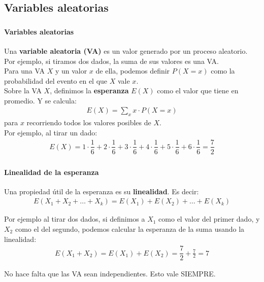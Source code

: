 \documentclass{beamer}
\begin{document}
\subsection{Variables aleatorias}

\begin{frame}
  \frametitle{\SECTIONA}
  \framesubtitle{Variables aleatorias}

  Una \textbf{variable aleatoria (VA)} es un valor generado por un proceso aleatorio. Por ejemplo, si tiramos dos dados, la suma de sus valores es una VA. \pause \\
  Para una VA \(X\) y un valor \(x\) de ella, podemos definir \(P(X = x)\) como la probabilidad del evento en el que \(X\) vale \(x\). \pause \\

  Sobre la VA \(X\), definimos la \textbf{esperanza} \(E(X)\) como el valor que tiene en promedio. Y se calcula:
  \begin{gather*}
    E(X) = \sum_{x}x \cdot P(X = x)
  \end{gather*}
  para \(x\) recorriendo todos los valores posibles de \(X\). \pause \\
  Por ejemplo, al tirar un dado:
  \begin{gather*}
    E(X) = 1 \cdot \dfrac{1}{6} + 2 \cdot \dfrac{1}{6} + 3 \cdot \dfrac{1}{6} + 4 \cdot \dfrac{1}{6} + 5 \cdot \dfrac{1}{6} + 6 \cdot \dfrac{1}{6} = \dfrac{7}{2}
  \end{gather*}
\end{frame}

\begin{frame}
  \frametitle{\SECTIONA}
  \framesubtitle{Linealidad de la esperanza}

  Una propiedad útil de la esperanza es su \textbf{linealidad}. Es decir:
  \begin{gather*}
    E(X_{1} + X_{2} + \ldots + X_{k}) = E(X_{1}) + E(X_{2}) + \ldots + E(X_{k})
  \end{gather*} \pause

  Por ejemplo al tirar dos dados, si definimos a \(X_{1}\) como el valor del primer dado, y \(X_{2}\) como el del segundo, podemos calcular la esperanza de la suma usando la linealidad:
  \begin{gather*}
    E(X_{1} + X_{2}) = E(X_{1}) + E(X_{2}) = \dfrac{7}{2} + \frac{7}{2} = 7
  \end{gather*} \pause

  No hace falta que las VA sean independientes. Esto vale SIEMPRE.
\end{frame}
\end{document}
